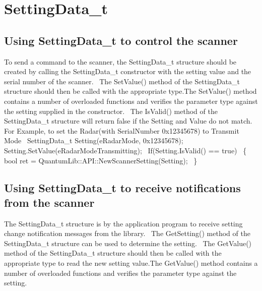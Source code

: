 \hypertarget{page3_SettingData}{}\section{Setting\+Data\+\_\+t}\label{page3_SettingData}
\hypertarget{page3_Control}{}\subsection{Using Setting\+Data\+\_\+t to control the scanner}\label{page3_Control}
To send a command to the scanner, the Setting\+Data\+\_\+t structure should be created by calling the Setting\+Data\+\_\+t constructor with the setting value and the serial number of the scanner.~\newline
The Set\+Value() method of the Setting\+Data\+\_\+t structure should then be called with the appropriate type.\+The Set\+Value() method contains a number of overloaded functions and verifies the parameter type against the setting supplied in the constructor.~\newline
The Is\+Valid() method of the Setting\+Data\+\_\+t structure will return false if the Setting and Value do not match.~\newline
For Example, to set the Radar(with Serial\+Number 0x12345678) to Transmit Mode~\newline
Setting\+Data\+\_\+t Setting(e\+Radar\+Mode, 0x12345678);~\newline
Setting.\+Set\+Value(e\+Radar\+Mode\+Transmitting);~\newline
If(Setting.\+Is\+Valid() == true)~\newline
\{~\newline
 bool ret = Quantum\+Lib\+::\+A\+P\+I\+::\+New\+Scanner\+Setting(\+Setting);~\newline
\}~\newline
\hypertarget{page3_Notify}{}\subsection{Using Setting\+Data\+\_\+t to receive notifications from the scanner}\label{page3_Notify}
The Setting\+Data\+\_\+t structure is by the application program to receive setting change notification messages from the library.~\newline
The Get\+Setting() method of the Setting\+Data\+\_\+t structure can be used to determine the setting.~\newline
The Get\+Value() method of the Setting\+Data\+\_\+t structure should then be called with the appropriate type to read the new setting value.\+The Get\+Value() method contains a number of overloaded functions and verifies the parameter type against the setting.~\newline
